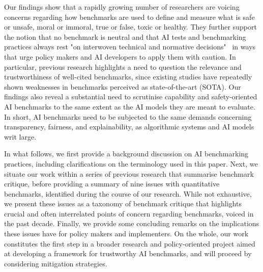 Our findings show that a rapidly growing number of researchers are voicing concerns regarding how benchmarks are used to define and measure what is safe or unsafe, moral or immoral, true or false, toxic or healthy. They further support the notion that no benchmark is neutral and that AI tests and benchmarking practices always rest "on interwoven technical and normative decisions"~\cite[p.~1201]{rauh2024} in ways that urge policy makers and AI developers to apply them with caution. In particular, previous research highlights a need to question the relevance and trustworthiness of well-cited benchmarks, since existing studies have repeatedly shown weaknesses in benchmarks perceived as state-of-the-art (SOTA). Our findings also reveal a substantial need to scrutinise capability and safety-oriented AI benchmarks to the same extent as the AI models they are meant to evaluate. In short, AI benchmarks need to be subjected to the same demands concerning transparency, fairness, and explainability, as algorithmic systems and AI models writ large. %

In what follows, we first provide a background discussion on AI benchmarking practices, including clarifications on the terminology used in this paper. Next, we situate our work within a series of previous research that summarise benchmark critique, before providing a summary of nine issues with quantitative benchmarks, identified during the course of our research. While not exhaustive, we present these issues as a taxonomy of benchmark critique that highlights crucial and often interrelated points of concern regarding benchmarks, voiced in the past decade. Finally, we provide some concluding remarks on the implications these issues have for policy makers and implementers. On the whole, our work constitutes the first step in a broader research and policy-oriented project aimed at developing a framework for trustworthy AI benchmarks, and will proceed by considering mitigation strategies.

